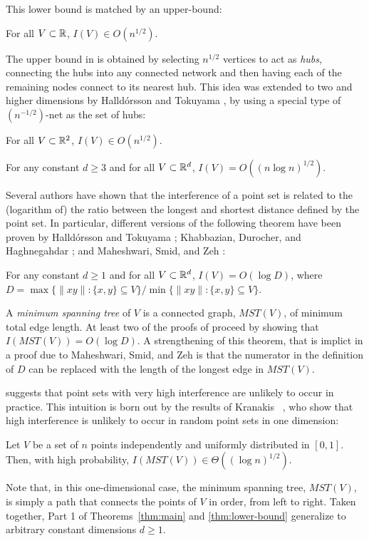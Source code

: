 \documentclass{patmorin}
\newcommand{\mst}{\mathit{MST}}
\begin{document}
This lower bound is matched by an upper-bound:
\begin{thm}
For all $V\subset\mathbb{R}$, $I(V)\in O(n^{1/2})$.
\end{thm}
The upper bound in  is obtained by selecting $n^{1/2}$
vertices to act as \emph{hubs}, connecting the hubs into any connected
network and then having each of the remaining nodes connect to its
nearest hub.  This idea was extended to two and higher dimensions
by Halld\'orsson and Tokuyama \cite{ht08}, by using a special type of
$(n^{-1/2})$-net as the set of hubs:
\begin{thm}
For all $V\subset\mathbb{R}^2$, $I(V)\in O(n^{1/2})$.  
\end{thm}
\begin{thm}
  For any constant $d\ge 3$ and for all $V\subset\mathbb{R}^d$, $I(V)=O((n\log
  n)^{1/2})$.
\end{thm}

Several authors have shown that the interference of a point set is
related to the (logarithm of) the ratio between the longest and shortest
distance defined by the point set.  In particular, different versions
of the following theorem have been proven by Halld\'orsson and Tokuyama
\cite{ht08}; Khabbazian, Durocher, and Haghnegahdar
\cite{kdh11}; and Maheshwari, Smid, and Zeh \cite{msz11}:
\begin{thm}
  For any constant $d\ge 1$ and for all $V\subset\mathbb{R}^d$,
  $I(V)=O(\log D)$, where $D=\max\{\|xy\|: \{x,y\}\subseteq V\}/\min\{\|xy\|:
  \{x,y\}\subseteq V\}$.
\end{thm}
A \emph{minimum spanning tree} of $V$ is a connected graph, $\mst(V)$,
of minimum total edge length.  At least two of the proofs of 
proceed by showing that $I(\mst(V))=O(\log D)$.  A strengthening of
this theorem, that is implict in a proof due to Maheshwari, Smid, and
Zeh \cite{msz11} is that the numerator in the definition of $D$ can be
replaced with the length of the longest edge in $\mst(V)$.

 suggests that point sets with very high interference are
unlikely to occur in practice.  This intuition is born out by the results
of Kranakis \etal\ \cite{kkmns10}, who show that high interference is
unlikely to occur in random point sets in one dimension:
\begin{thm}
  Let $V$ be a set of $n$ points independently and uniformly distributed
  in $[0,1]$.  Then, with high probability, $I(\mst(V))\in \Theta((\log
  n)^{1/2})$.
\end{thm}
Note that, in this one-dimensional case, the minimum spanning tree,
$\mst(V)$, is simply a path that connects the points of $V$ in order,
from left to right.  Taken together, Part 1 of Theorems~\ref{thm:main}
and \ref{thm:lower-bound} generalize  to arbitrary
constant dimensions $d\ge 1$.
\end{document}
